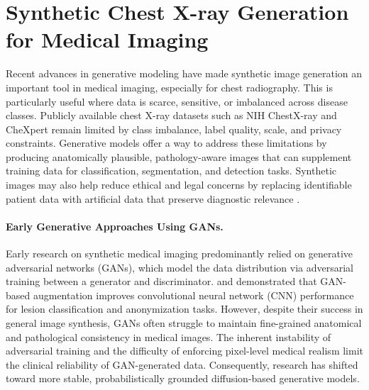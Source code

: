 
\section{Synthetic Chest X-ray Generation for Medical Imaging}

Recent advances in generative modeling have made synthetic image generation an important tool in medical imaging, especially for chest radiography. 
This is particularly useful where data is scarce, sensitive, or imbalanced across disease classes. 
Publicly available chest X-ray datasets such as NIH ChestX-ray \citep{wang2017chestxray8} and CheXpert \citep{Chexpert} remain limited by class imbalance, label quality, scale, and privacy constraints. 
Generative models offer a way to address these limitations by producing anatomically plausible, pathology-aware images that can supplement training data for classification, segmentation, and detection tasks. 
Synthetic images may also help reduce ethical and legal concerns by replacing identifiable patient data with artificial data that preserve diagnostic relevance \citep{generative_ai_medical_imaging_2025}. 

\paragraph{Early Generative Approaches Using GANs.}
Early research on synthetic medical imaging predominantly relied on generative adversarial networks (GANs), which model the data distribution via adversarial training between a generator and discriminator. \citet{gan_medical_image_augmentation_2018} and \citet{medical_image_synthesis_gans_2018} demonstrated that GAN-based augmentation improves convolutional neural network (CNN) performance for lesion classification and anonymization tasks. However, despite their success in general image synthesis, GANs often struggle to maintain fine-grained anatomical and pathological consistency in medical images. The inherent instability of adversarial training and the difficulty of enforcing pixel-level medical realism limit the clinical reliability of GAN-generated data. Consequently, research has shifted toward more stable, probabilistically grounded diffusion-based generative models.


